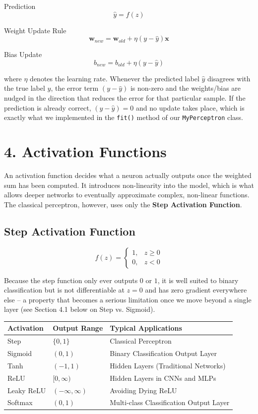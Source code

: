\documentclass[11pt]{article}
\begin{document}
Prediction
\[
\hat y=f(z)
\]

Weight Update Rule
\[
\mathbf{w}_{new}=\mathbf{w}_{old}+\eta(y-\hat y)\mathbf{x}
\]

Bias Update
\[
b_{new}=b_{old}+\eta(y-\hat y)
\]

where $\eta$ denotes the learning rate. Whenever the predicted label $\hat y$ disagrees with the true label $y$, the error term $(y-\hat y)$ is non-zero and the weights/bias are nudged in the direction that reduces the error for that particular sample. If the prediction is already correct, $(y-\hat y)=0$ and no update takes place, which is exactly what we implemented in the \texttt{fit()} method of our \texttt{MyPerceptron} class.

\section*{4. Activation Functions}

An activation function decides what a neuron actually outputs once the weighted sum has been computed. It introduces non-linearity into the model, which is what allows deeper networks to eventually approximate complex, non-linear functions. The classical perceptron, however, uses only the \textbf{Step Activation Function}.

\subsection*{Step Activation Function}
\[
f(z)=
\begin{cases}
1,&z\ge0\\
0,&z<0
\end{cases}
\]

Because the step function only ever outputs $0$ or $1$, it is well suited to binary classification but is not differentiable at $z=0$ and has zero gradient everywhere else -- a property that becomes a serious limitation once we move beyond a single layer (see Section 4.1 below on Step vs. Sigmoid).

\begin{center}
\begin{tabular}{|p{2.5cm}|p{3cm}|p{6cm}|}
\hline
\textbf{Activation} & \textbf{Output Range} & \textbf{Typical Applications}\\
\hline
Step & $\{0,1\}$ & Classical Perceptron\\
\hline
Sigmoid & $(0,1)$ & Binary Classification Output Layer\\
\hline
Tanh & $(-1,1)$ & Hidden Layers (Traditional Networks)\\
\hline
ReLU & $[0,\infty)$ & Hidden Layers in CNNs and MLPs\\
\hline
Leaky ReLU & $(-\infty,\infty)$ & Avoiding Dying ReLU\\
\hline
Softmax & $(0,1)$ & Multi-class Classification Output Layer\\
\hline
\end{tabular}
\end{center}
\end{document}
